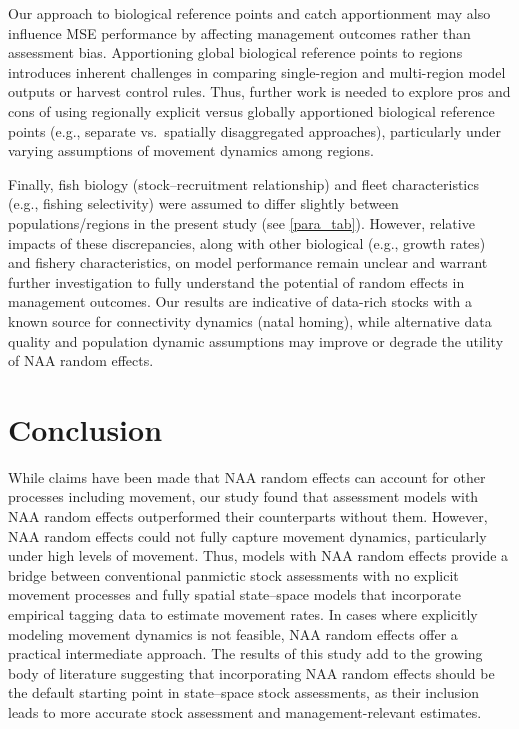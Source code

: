 \documentclass[
  12pt,
]{article}
\begin{document}
Our approach to biological reference points and catch apportionment may
also influence MSE performance by affecting management outcomes rather
than assessment bias. Apportioning global biological reference points to
regions introduces inherent challenges in comparing single-region and
multi-region model outputs or harvest control rules. Thus, further work
is needed to explore pros and cons of using regionally explicit versus
globally apportioned biological reference points (e.g., separate
vs.~spatially disaggregated approaches), particularly under varying
assumptions of movement dynamics among regions.

Finally, fish biology (stock--recruitment relationship) and fleet
characteristics (e.g., fishing selectivity) were assumed to differ
slightly between populations/regions in the present study (see
\autoref{para_tab}). However, relative impacts of these discrepancies,
along with other biological (e.g., growth rates) and fishery
characteristics, on model performance remain unclear and warrant further
investigation to fully understand the potential of random effects in
management outcomes. Our results are indicative of data-rich stocks with
a known source for connectivity dynamics (natal homing), while
alternative data quality and population dynamic assumptions may improve
or degrade the utility of NAA random effects.

\hypertarget{conclusion}{%
\section{Conclusion}\label{conclusion}}

While claims have been made that NAA random effects can account for
other processes including movement, our study found that assessment
models with NAA random effects outperformed their counterparts without
them. However, NAA random effects could not fully capture movement
dynamics, particularly under high levels of movement. Thus, models with
NAA random effects provide a bridge between conventional panmictic stock
assessments with no explicit movement processes and fully spatial
state--space models that incorporate empirical tagging data to estimate
movement rates. In cases where explicitly modeling movement dynamics is
not feasible, NAA random effects offer a practical intermediate
approach. The results of this study add to the growing body of
literature suggesting that incorporating NAA random effects should be
the default starting point in state--space stock assessments, as their
inclusion leads to more accurate stock assessment and
management-relevant estimates.
\end{document}
